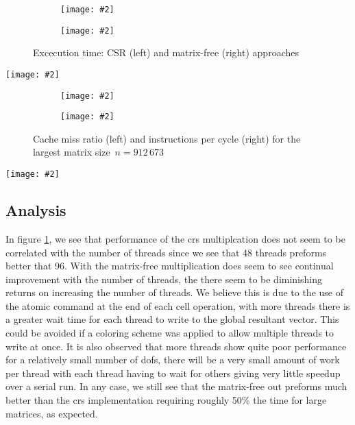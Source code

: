 \documentclass[12pt]{article}
\newcommand{\includegraphicsw}[2][1.]{\texttt{[image: \#2]}}
\begin{document}
\begin{figure}[H]
	\centering
	\begin{subfigure}{.5\linewidth}
		\includegraphicsw{clTime.pdf}
	\end{subfigure}%
	\begin{subfigure}{.5\linewidth}
		\includegraphicsw{mfTime.pdf}
	\end{subfigure}%
	\caption{Excecution time: CSR (left) and matrix-free (right) approaches}\label{fig:time}
\end{figure}

\begin{table}[H]
	\centering\caption{Best thread team sizes (see Figure~\ref{fig:time})}
	\includegraphicsw[.9]{bestTime.pdf}
\end{table}

\begin{figure}[H]
	\centering
	\begin{subfigure}{.5\linewidth}
		\includegraphicsw{cache.pdf}
	\end{subfigure}%
	\begin{subfigure}{.5\linewidth}
		\includegraphicsw{inst.pdf}
	\end{subfigure}
	\caption{Cache miss ratio (left) and instructions per cycle (right) for the largest matrix size~$n = 912\,673$}\label{fig:cache}
\end{figure}

\begin{table}[H]
	\centering\caption{Energy consumption for a single thread; TDP = 150\,W}\label{fig:rapl}
	\includegraphicsw[.9]{rapl.pdf}
\end{table}

\subsection{Analysis}
In figure \ref{fig:time}, we see that performance of the crs multiplcation does not seem to be correlated with the number of threads since we see that 48 threads preforms better that 96. With the matrix-free multiplication does seem to see continual improvement with the number of threads, the there seem to be diminishing returns on increasing the number of threads. We believe this is due to the use of the atomic command at the end of each cell operation, with more threads there is a greater wait time for each thread to write to the global resultant vector. This could be avoided if a coloring scheme was applied to allow multiple threads to write at once. It is also observed that more threads show quite poor performance for a relatively small number of dofs, there will be a very small amount of work per thread with each thread having to wait for others giving very little speedup over a serial run. In any case, we still see that the matrix-free out preforms much better than the crs implementation requiring roughly 50\% the time for large matrices, as expected.
\end{document}

